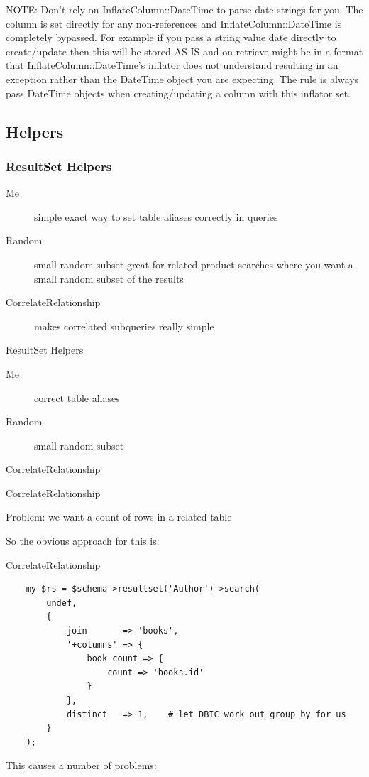 NOTE: Don't rely on InflateColumn::DateTime to parse date strings for
you. The column is set directly for any non-references and
InflateColumn::DateTime is completely bypassed. For example if you pass a
string value date directly to create/update then this will be stored AS IS
and on retrieve might be in a format that InflateColumn::DateTime’s inflator
does not understand resulting in an exception rather than the DateTime
object you are expecting. The rule is always pass DateTime objects when
creating/updating a column with this inflator set. 

\subsection{Helpers}
\subsubsection{ResultSet Helpers}
\begin{description}
\item[Me] 
simple exact way to set table aliases correctly in queries
\item[Random] small random subset
great for related product searches where you want a small 
random subset of the results
\item[CorrelateRelationship] 
makes correlated subqueries really simple
\end{description}

\begin{frame}{ResultSet Helpers}
\begin{description}
\item[Me] correct table aliases
\item[Random] small random subset
\item[CorrelateRelationship]  
\end{description}
\end{frame}

\begin{frame}{CorrelateRelationship}

Problem: we want a count of rows in a related table

\end{frame}

So the obvious approach for this is:

\begin{frame}[fragile]{CorrelateRelationship}
\begin{lstlisting}
    my $rs = $schema->resultset('Author')->search(
        undef,
        {
            join       => 'books',
            '+columns' => {
                book_count => {
                    count => 'books.id'
                }
            },
            distinct   => 1,    # let DBIC work out group_by for us
        }
    );
\end{lstlisting}
\end{frame}
This causes a number of problems:

